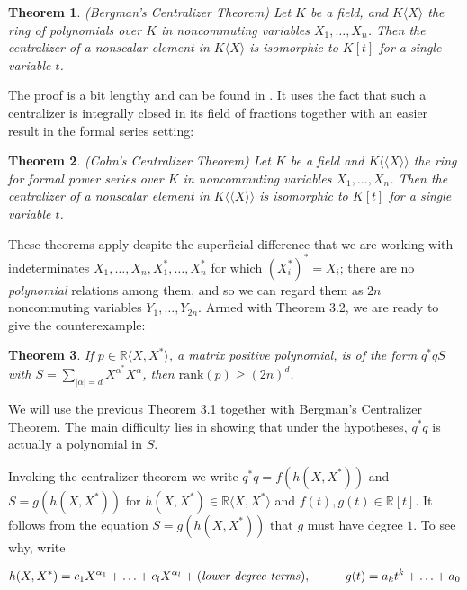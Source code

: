 \documentclass[11pt]{amsart}
\newtheorem{theorem}{Theorem}[section]
\begin{document}
\begin{theorem}
(Bergman's Centralizer Theorem) Let $K$ be a field, and $K\langle X\rangle$ the ring of polynomials over $K$ in noncommuting variables $X_1,\ldots,X_n$.  Then the centralizer of a nonscalar element in $K\langle X\rangle$ is isomorphic to $K[t]$ for a single variable $t$.
\end{theorem}
The proof is a bit lengthy and can be found in \cite{LO}.  It uses the fact that such a centralizer is integrally closed in its field of fractions together with an easier result in the formal series setting:

\begin{theorem}(Cohn's Centralizer Theorem) Let $K$ be a field and $K\langle \langle X \rangle \rangle$ the ring for formal power series over $K$ in noncommuting variables $X_1, \ldots,X_n$. Then the centralizer of a nonscalar element in $K\langle \langle X \rangle \rangle$ is isomorphic to $K[t]$ for a single variable $t$.

\end{theorem}

These theorems apply despite the superficial difference that we are working with indeterminates $X_1,\ldots,X_n,X_1^*, \ldots,X_n^*$ for which $(X_i^*)^*=X_i$; there are no \emph{polynomial} relations among them, and so we can regard them as $2n$ noncommuting variables $Y_1, \ldots,Y_{2n}$. Armed with Theorem 3.2, we are ready to give the counterexample:

\begin{theorem}

If $p \in \mathbb{R}\langle X, X^*\rangle$, a matrix positive polynomial, is of the form $q^*qS$ with $S=\sum_{|\alpha|=d} X^{\alpha^*}X^\alpha$, then $\text{rank}(p) \geq (2n)^d$. 
\end{theorem}
\proof We will use the previous Theorem 3.1 together with Bergman's Centralizer Theorem.  The main difficulty lies in showing that under the hypotheses, $q^*q$ is actually a polynomial in $S$.

Invoking the centralizer theorem we write $q^*q=f(h(X,X^*))$ and $S=g(h(X,X^*))$ for $h(X,X^*) \in \mathbb{R}\langle X,X^*\rangle$ and $f(t),g(t) \in \mathbb{R}[t]$. It follows from the equation $S=g(h(X,X^*))$ that $g$ must have degree $1$.  To see why, write 

\[h(X,X^*)=c_1X^{\alpha_1}+\ldots+c_lX^{\alpha_l}+(\text{\emph{lower degree terms}}), \hspace{1cm}g(t)=a_kt^k+\ldots+a_0\]
\end{document}
